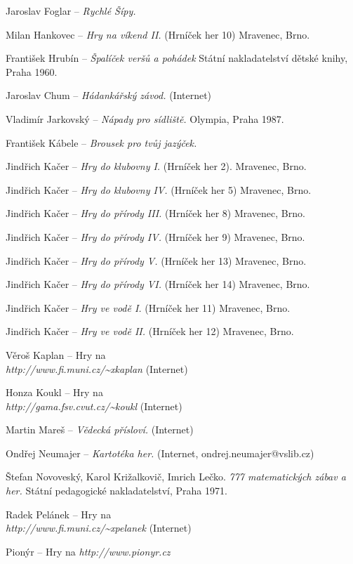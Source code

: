 \begin{multicols}{2}
\begin{list}{[]}{}
\item Jaroslav Foglar -- {\it Rychlé Šípy.}
\item Milan Hankovec -- {\it Hry na víkend II.} (Hrníček her 10)
  Mravenec, Brno.
\item František Hrubín -- {\it Špalíček veršů a pohádek}
  Státní nakladatelství dětské knihy, Praha 1960.
\item Jaroslav Chum -- {\it Hádankářský závod.}
  (Internet)
\item Vladimír Jarkovský -- {\it Nápady pro sídliště.}
  Olympia, Praha 1987.
\item František Kábele -- {\it Brousek pro tvůj jazýček.}
\item Jindřich Kačer -- {\it Hry do klubovny I.} (Hrníček her 2).
  Mravenec, Brno.
\item Jindřich Kačer -- {\it Hry do klubovny IV.} (Hrníček her 5)
  Mravenec, Brno.
\item Jindřich Kačer -- {\it Hry do přírody III.} (Hrníček her 8)
  Mravenec, Brno.
\item Jindřich Kačer -- {\it Hry do přírody IV.} (Hrníček her 9)
  Mravenec, Brno.
\item Jindřich Kačer -- {\it Hry do přírody V.} (Hrníček her 13)
  Mravenec, Brno.
\item Jindřich Kačer -- {\it Hry do přírody VI.} (Hrníček her 14)
  Mravenec, Brno.
\item Jindřich Kačer -- {\it Hry ve vodě I.} (Hrníček her 11)
  Mravenec, Brno.
\item Jindřich Kačer -- {\it Hry ve vodě II.} (Hrníček her 12)
  Mravenec, Brno.
\item Věroš Kaplan -- Hry na \\{\it http://www.fi.muni.cz/{\textasciitilde}xkaplan}
  (Internet)
\item Honza Koukl -- Hry na \\{\it http://gama.fsv.cvut.cz/{\textasciitilde}koukl}
  (Internet)
\item Martin Mareš -- {\it Vědecká přísloví.}
  (Internet)
\item Ondřej Neumajer -- {\it Kartotéka her.}
  (Internet, ondrej.neumajer@vslib.cz)
\item Štefan Novoveský, Karol Križalkovič, Imrich Lečko.
  {\it 777 matematických zábav a her.} Státní pedagogické nakladatelství,
  Praha 1971.
\item Radek Pelánek -- Hry na \\{\it http://www.fi.muni.cz/{\textasciitilde}xpelanek}
  (Internet)
\item Pionýr -- Hry na {\it http://www.pionyr.cz}

\end{list}
\end{multicols}
